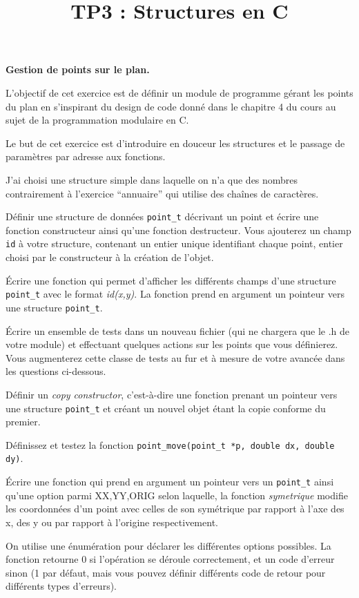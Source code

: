 \documentclass[10pt]{article}\usepackage[correction,nu]{esial}
\title{TP3 : Structures en C}
\begin{document}
\maketitle

\Exercice \textbf{Gestion de points sur le plan.}

L'objectif de cet exercice est de définir un module de programme
gérant les points du plan en s'inspirant du design de code donné dans
le chapitre 4 du cours au sujet de la programmation modulaire en C.
 
\begin{Reponse}
Le but de cet exercice est d'introduire en douceur les structures et
le passage de paramètres par adresse aux fonctions.

J'ai choisi une structure simple dans laquelle on n'a que des nombres
contrairement à l'exercice ``annuaire'' qui utilise des chaînes de
caractères.
\end{Reponse}

\Question Définir une structure de données \texttt{point\_t} décrivant
un point et écrire une fonction constructeur ainsi qu'une fonction
destructeur. Vous ajouterez un champ \texttt{id} à votre structure,
contenant un entier unique identifiant chaque point, entier choisi par
le constructeur à la création de l'objet.

\Question Écrire une fonction qui permet d'afficher les différents
champs d'une structure \texttt{point\_t} avec le format {\em
  id(x,y)}. La fonction prend en argument un pointeur vers une
structure \texttt{point\_t}.

\Question Écrire un ensemble de tests dans un nouveau fichier (qui ne
chargera que le .h de votre module) et effectuant quelques actions sur
les points que vous définierez. Vous augmenterez cette classe de tests
au fur et à mesure de votre avancée dans les questions ci-dessous.

\Question Définir un \textit{copy constructor}, c'est-à-dire une
fonction prenant un pointeur vers une structure \texttt{point\_t} et
créant un nouvel objet étant la copie conforme du premier.

\Question Définissez et testez la fonction
\texttt{point\_move(point\_t *p, double dx, double dy)}.

\begin{Question} Écrire une fonction 
  qui prend en argument un pointeur vers un \texttt{point\_t} ainsi
  qu'une option parmi {XX,YY,ORIG} selon laquelle, la fonction {\em
    symetrique} modifie les coordonnées d'un point avec celles de son
  symétrique par rapport à l'axe des x, des y ou par rapport à
  l'origine respectivement.

  On utilise une énumération pour déclarer les différentes options
  possibles. La fonction retourne 0 si l'opération se déroule
  correctement, et un code d'erreur sinon (1 par défaut, mais vous
  pouvez définir différents code de retour pour différents types
  d'erreurs).
\end{Question}
\end{document}
